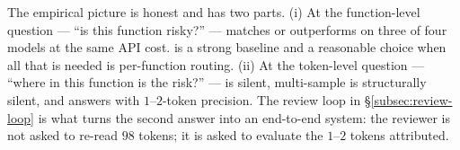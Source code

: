 The empirical picture is honest and has two parts. (i) At the
function-level question --- ``is this function risky?'' --- \papg
matches or outperforms \eps on three of four models at the same API
cost. \papg is a strong baseline and a reasonable choice when all
that is needed is per-function routing. (ii) At the token-level
question --- ``where in this function is the risk?'' --- \papg is
silent, multi-sample is structurally silent, and \eps answers with
$1$--$2$-token precision. The review loop in
\S\ref{subsec:review-loop} is what turns the second answer into an
end-to-end system: the reviewer is not asked to re-read $98$ tokens;
it is asked to evaluate the $1$--$2$ tokens \eps attributed.
